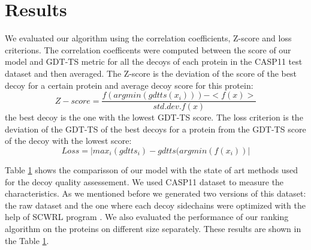 \documentclass[a4paper,10pt]{article}
\begin{document}
\section{Results}
We evaluated our algorithm using the correlation coefficients, Z-score and loss criterions. The correlation coefficents were computed between the score of 
our model and GDT-TS metric for all the decoys of each protein in the CASP11 test dataset and then averaged. The Z-score is the deviation of the score of 
the best decoy for a certain protein and average decoy score for this protein:
$$ 
Z-score = \frac{f( argmin(gdtts(x_i)) ) - <f(x)>}{std.dev.f(x)}
$$ 
the best decoy is the one with the lowest GDT-TS score. 
The loss criterion is the deviation of the GDT-TS of the best decoys for a protein from the GDT-TS score of the decoy with the lowest score:
$$ 
Loss = | max_i( gdtts_i ) - gdtts( argmin(f(x_i) ) |
$$ 

Table \ref{} shows the comparisson of our model with the state of art methods used for the decoy quality assessement. We used CASP11 dataset to measure the 
characteristics. As we mentioned before we generated two versions of this dataset: the raw dataset and the one where each decoy sidechains were optimized with 
the help of SCWRL program \cite{}. We also evaluated the performance of our ranking algorithm on the proteins on different size separately. These results are shown 
in the Table \ref{}. 
\end{document}

